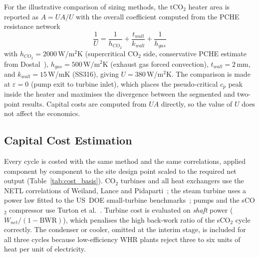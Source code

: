 \documentclass[12pt,a4paper]{report}
\begin{document}
For the illustrative comparison of sizing methods, the tCO$_2$ heater area is
reported as $A = UA/U$ with the overall coefficient computed from the PCHE
resistance network
\begin{equation}
\frac{1}{U} = \frac{1}{h_{CO_2}} + \frac{t_{wall}}{k_{wall}} + \frac{1}{h_{gas}}
\label{eq:U_overall}
\end{equation}
with $h_{CO_2} = 2000$\,W/m$^2$K (supercritical CO$_2$ side, conservative
PCHE estimate from Dostal~\cite{Dostal2004}), $h_{gas} = 500$\,W/m$^2$K
(exhaust gas forced convection), $t_{wall} = 2$\,mm, and $k_{wall} =
15$\,W/mK (SS316), giving $U = 380$\,W/m$^2$K. The comparison is made at
$\varepsilon = 0$ (pump exit to turbine inlet), which places the
pseudo-critical $c_p$ peak inside the heater and maximises the divergence
between the segmented and two-point results. Capital costs are computed from
$UA$ directly, so the value of $U$ does not affect the economics.

\subsection{Capital Cost Estimation}
\label{sec:method_cost}

Every cycle is costed with the same method and the same correlations, applied
component by component to the site design point scaled to the required net
output (Table~\ref{tab:cost_basis}). CO$_2$ turbines and all heat exchangers
use the NETL correlations of Weiland, Lance and Pidaparti~\cite{Weiland2019};
the steam turbine uses a power law fitted to the US~DOE small-turbine
benchmarks~\cite{DOE2012}; pumps and the sCO$_2$ compressor use Turton et
al.~\cite{Turton2012}. Turbine cost is evaluated on \emph{shaft} power
($\dot{W}_{net}/(1-\mathrm{BWR})$), which penalises the high back-work ratio
of the sCO$_2$ cycle correctly. The condenser or cooler, omitted at the
interim stage, is included for all three cycles because low-efficiency WHR
plants reject three to six units of heat per unit of electricity.
\end{document}
